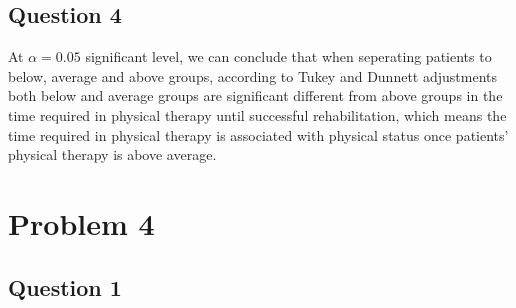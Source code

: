 \documentclass[]{article}
\begin{document}
\subsection{Question 4}\label{question-4-1}

At \(\alpha = 0.05\) significant level, we can conclude that when
seperating patients to below, average and above groups, according to
Tukey and Dunnett adjustments both below and average groups are
significant different from above groups in the time required in physical
therapy until successful rehabilitation, which means the time required
in physical therapy is associated with physical status once patients'
physical therapy is above average.

\section{Problem 4}\label{problem-4}

\subsection{Question 1}\label{question-1-3}
\end{document}
